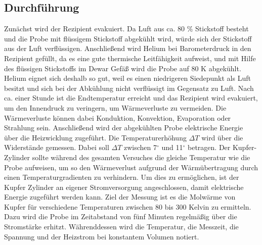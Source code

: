 \subsection{Durchführung}
Zunächst wird der Rezipient evakuiert. Da Luft aus ca. 80 $\%$ Stickstoff besteht und die Probe mit flüssigem Stickstoff abgekühlt wird, würde sich der Stickstoff aus der Luft verflüssigen. Anschließend wird Helium bei Barometerdruck in den Rezipient gefüllt, da es eine gute thermische Leitfähigkeit aufweist, und mit Hilfe des flüssigen Stickstoffs im Dewar Gefäß wird die Probe auf 80 K abgekühlt. Helium eignet sich deshalb so gut, weil es einen niedrigeren Siedepunkt als Luft besitzt und sich bei der Abkühlung nicht verflüssigt im Gegensatz zu Luft. Nach ca. einer Stunde ist die Endtemperatur erreicht und das Rezipient wird evakuiert, um den Innendruck zu veringern, um Wärmeverluste zu vermeiden. Die Wärmeverluste können dabei Konduktion, Konvektion, Evaporation oder Strahlung sein. Anschließend wird der abgekühlten Probe elektrische Energie über die Heizwicklung zugeführt. Die Temperaturerhöhung $\Delta T$ wird über die Widerstände gemessen. Dabei soll $\Delta T$ zwischen 7$^{\circ}$ und 11$^{\circ}$ betragen. Der Kupfer-Zylinder sollte während des gesamten Versuches die gleiche Temperatur wie die Probe aufweisen, um so den Wärmeverlust aufgrund der Wärmübertragung durch einen Temperaturgradienten zu verhindern. Um dies zu ermöglichen, ist der Kupfer Zylinder an eigener Stromversorgung angeschlossen, damit elektrische Energie zugeführt werden kann. Ziel der Messung ist es die Molwärme von Kupfer für verschiedene Temperaturen zwischen 80 bis 300 Kelvin zu ermitteln. Dazu wird die Probe im Zeitabstand von fünf Minuten regelmäßig über die Stromstärke erhitzt. Währenddessen wird die Temperatur, die Messzeit, die Spannung und der Heizstrom bei konstantem Volumen notiert.  